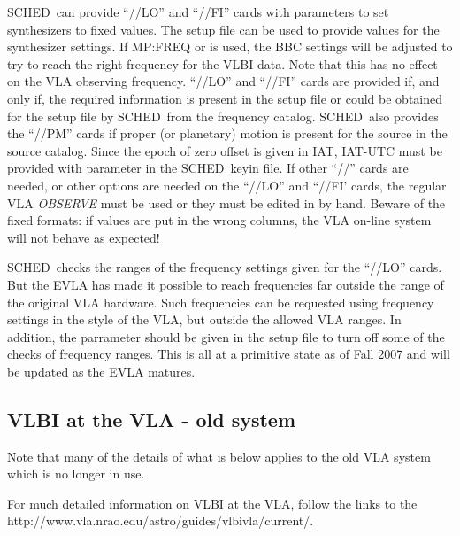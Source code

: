 \documentclass{report}
\newcommand{\schedb}{{\sc SCHED~}}
\begin{document}
\schedb can provide ``//LO'' and ``//FI'' cards with parameters to set
synthesizers to fixed values. The setup file can be used to provide
values for the synthesizer settings. If  {MP:FREQ}
or  is used, the BBC settings will
be adjusted to try to reach the right frequency for the VLBI
data. Note that this has no effect on the VLA observing
frequency. ``//LO'' and ``//FI'' cards are provided if, and only if,
the required information is present in the setup file or could be
obtained for the setup file by \schedb from the frequency catalog.
\schedb also provides the ``//PM'' cards if proper (or planetary)
motion is present for the source in the source catalog. Since the
epoch of zero offset is given in IAT, IAT-UTC must be provided with
parameter  in the \schedb keyin
file. If other ``//'' cards are needed, or other options are needed on
the ``//LO'' and ``//FI' cards, the regular VLA {\sl OBSERVE} must be
used or they must be edited in by hand. Beware of the fixed formats:
if values are put in the wrong columns, the VLA on-line system will
not behave as expected!

\schedb checks the ranges of the frequency settings given for the
``//LO'' cards.  But the EVLA has made it possible to reach
frequencies far outside the range of the original VLA hardware.  Such
frequencies can be requested using frequency settings in the style of
the VLA, but outside the allowed VLA ranges.  In addition, the
parrameter  should be given in the setup
file to turn off some of the checks of frequency ranges.  This is all
at a primitive state as of Fall 2007 and will be updated as the EVLA
matures.

\subsection{\label{SSEC:VLAVLBIOLD}VLBI at the VLA - old system}

Note that many of the details of what is below applies to the old VLA
system which is no longer in use.  

For much detailed information on VLBI at the VLA, follow the links to
the 
{http://www.vla.nrao.edu/astro/guides/vlbivla/current/}.
\end{document}

